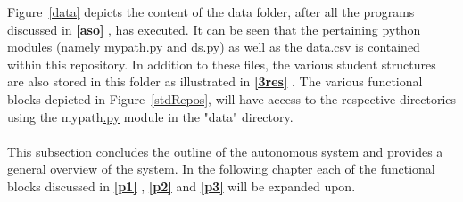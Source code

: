 Figure~\ref{data} depicts the content of the data folder, after all the programs discussed in \textbf{\ref{aso} }, has executed. It can be seen that the pertaining python modules (namely mypath\hyperref[listExt]{.py} and ds\hyperref[listExt]{.py}) as well as the data\hyperref[listExt]{.csv} is contained within this repository. In addition to these files, the various student structures are also stored in this folder as illustrated in \textbf{\ref{3res} }. The various functional blocks depicted in Figure~\ref{stdRepos}, will have access to the respective directories using the mypath\hyperref[listExt]{.py} module in the "data" directory.
\\\\
This subsection concludes the outline of the autonomous system and provides a general overview of the system. In the following chapter each of the functional blocks discussed in \textbf{\ref{p1} }, \textbf{\ref{p2} } and \textbf{\ref{p3} } will be expanded upon.
